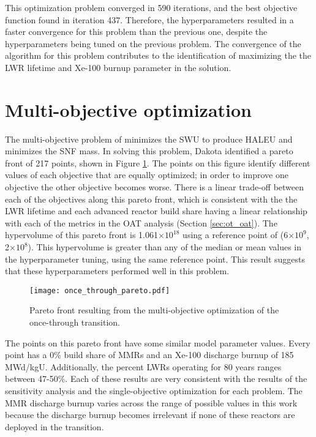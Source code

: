 This optimization problem converged in 590 iterations, and the best objective 
function found in iteration 437. Therefore, the hyperparameters resulted 
in a faster convergence for this problem than the previous one, despite the 
hyperparameters being tuned on the previous problem. The convergence of 
the algorithm for this problem contributes to the identification 
of maximizing the the \gls{LWR} lifetime and Xe-100 burnup parameter 
in the solution. 

\section{Multi-objective optimization}
The multi-objective problem of minimizes the \gls{SWU} to produce 
\gls{HALEU} and minimizes the \gls{SNF} mass. In solving 
this problem, Dakota identified a pareto front 
of 217 points, shown in Figure \ref{fig:once_through_pareto}. The points 
on this figure identify different values of each objective that are equally 
optimized; in order to improve one objective the other objective becomes 
worse. There is a linear trade-off between each of the objectives along this 
pareto front, which is consistent with the the \gls{LWR} lifetime and 
each advanced reactor build share having a linear relationship with 
each of the metrics in the \gls{OAT} analysis (Section \ref{sec:ot_oat}). 
The hypervolume of this pareto front is 1.061$\times 10^{18}$ using a 
reference point of (6$\times 10^9$, 2$\times 10^8$). This hypervolume is 
greater than any of the median or mean values in the hyperparameter tuning,
using the same reference point. This result suggests that these hyperparameters 
performed well in this problem. 


\begin{figure}[h!][h!][h!]
    \centering 
    \texttt{[image: once\_through\_pareto.pdf]}
    \caption{Pareto front resulting from the multi-objective optimization 
    of the once-through transition.}
    \label{fig:once_through_pareto}
\end{figure}

The points on this pareto front have some similar model parameter values. 
Every point has a 0\% build share of \glspl{MMR} and an Xe-100 discharge 
burnup of 185 MWd/kgU. Additionally, the percent \glspl{LWR} operating 
for 80 years ranges between 47-50\%. Each of these results are very 
consistent with the results of the sensitivity analysis and the 
single-objective optimization for each problem. The \gls{MMR} discharge 
burnup varies 
across the range of possible values in this work because the discharge 
burnup becomes irrelevant if none of these reactors are deployed in the
transition.

